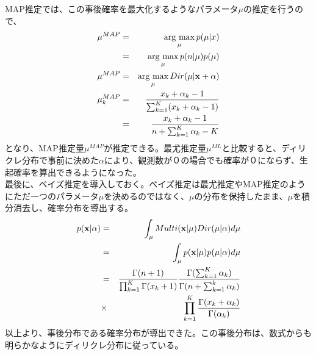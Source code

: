 \documentclass[uplatex,11pt]{jsarticle}
\newcommand{\argmax}{\mathop{\rm arg~max}\limits}
\begin{document}
MAP推定では、この事後確率を最大化するようなパラメータ$\mu$の推定を行うので、
\begin{eqnarray*}
    \mu^{MAP}   &=& \argmax_{\mu} p(\mu|x) \\
                &=& \argmax_{\mu} p(n|\mu)p(\mu) \\
    \mu^{MAP}   &=& \argmax_{\mu} Dir(\mu|{\bf x}+\alpha) \\
    \mu_k^{MAP} &=& \frac{x_k + \alpha_k -1}{\sum_{k=1}^{K}(x_k + \alpha_k -1)}\\
                &=& \frac{x_k + \alpha_k -1}{n+\sum_{k=1}^{K}\alpha_k - K}\\
\end{eqnarray*}
となり、MAP推定量$\mu^{MAP}$が推定できる。最尤推定量$\mu^{ML}$と比較すると、ディリクレ分布で事前に決めた$\alpha$により、観測数が０の場合でも確率が０にならず、生起確率を算出できるようになった。
\\最後に、ベイズ推定を導入しておく。ベイズ推定は最尤推定やMAP推定のようにただ一つのパラメータ$\mu$を決めるのではなく、$\mu$の分布を保持したまま、$\mu$を積分消去し、確率分布を導出する。\\
\begin{eqnarray*}
    p({\bf x}|\alpha)
    &=& \int_{\mu}Multi({\bf x}|\mu)Dir(\mu|\alpha)d\mu \\
    &=& \int_{\mu} p({\bf x}|\mu)p(\mu|\alpha) d\mu \\
    &=& \frac{\Gamma(n+1)}{\prod_{k=1}^K \Gamma(x_k +1)} \frac{\Gamma (\sum_{k=1}^K \alpha_k)}{\Gamma(n + \sum_{k=1}^k \alpha_k)}\\
    &\times& \prod_{k=1}^K \frac{\Gamma(x_k + \alpha_k)}{\Gamma (\alpha_k)}
\end{eqnarray*}
以上より、事後分布である確率分布が導出できた。この事後分布は、数式からも明らかなようにディリクレ分布に従っている。
\end{document}
